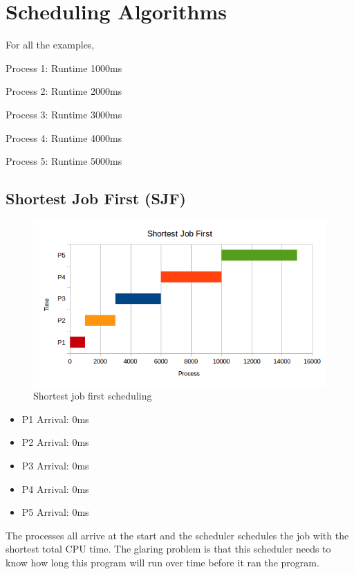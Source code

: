 \section{Scheduling Algorithms}

For all the examples,

Process 1: Runtime 1000ms

Process 2: Runtime 2000ms

Process 3: Runtime 3000ms

Process 4: Runtime 4000ms

Process 5: Runtime 5000ms

\subsection{Shortest Job First (SJF)}

\begin{figure}[htbp]
\centering
\includegraphics[width=\textwidth]{scheduling/images/sjf.png}
\caption{Shortest job first scheduling}
\end{figure}

\begin{itemize}
\tightlist
\item
  P1 Arrival: 0ms
\item
  P2 Arrival: 0ms
\item
  P3 Arrival: 0ms
\item
  P4 Arrival: 0ms
\item
  P5 Arrival: 0ms
\end{itemize}

The processes all arrive at the start and the scheduler schedules the job with the shortest total CPU time. The glaring problem is that this scheduler needs to know how long this program will run over time before it ran the program.

